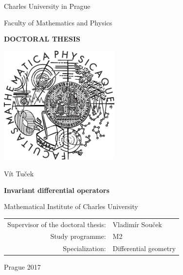 
\pagestyle{empty}
\begin{center}

\large

Charles University in Prague

\medskip

Faculty of Mathematics and Physics

\vfill

{\bf\Large DOCTORAL THESIS}

\vfill

\centerline{\mbox{\includegraphics[width=60mm]{logo.eps}}}

\vfill
\vspace{5mm}

{\LARGE Vít Tuček}

\vspace{15mm}

{\LARGE\bfseries Invariant differential operators}

\vfill

Mathematical Institute of Charles University

\vfill

\begin{tabular}{rl}

Supervisor of the doctoral thesis: & Vladimír Souček \\
\noalign{\vspace{2mm}}
Study programme: & M2 \\	%
\noalign{\vspace{2mm}}
Specialization: & Differential geometry \\
\end{tabular}

\vfill

Prague 2017

\end{center}

